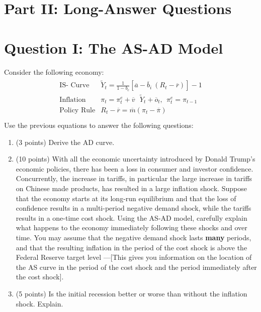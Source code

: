 \documentclass[letterpaper,12pt]{article}
\theoremstyle{dotlessS}
\begin{document}
\section{Part II: Long-Answer Questions}



\section*{Question I: The AS-AD Model}
Consider the following economy:
\begin{eqnarray*}
\begin{array}{ll}
\text{IS- Curve} & \widetilde{Y}_t=\frac{1}{1-b_c}\left[\overline{a}-\overline{b}_i \: (R_t-\overline{r})\right]-1 \\[1.4ex]
\text{Inflation} & \pi_t=\pi^e_t+\overline{v} \: \: \: \widetilde{Y}_t+\overline{o}_t, \: \: \pi^e_t=\pi_{t-1}  \\[1.4ex]
\text{Policy Rule} & R_t-\overline{r}=\overline{m}(\pi_t-\overline{\pi})  \\[1.4ex]
\end{array}
\end{eqnarray*}
Use the previous equations to answer the following questions:
\begin{enumerate}[label=(\alph*)]
\item (3 points) Derive the AD curve.
\item (10 points) With all the economic uncertainty introduced by Donald Trump's economic policies, there has been a loss in consumer and investor confidence. Concurrently, the increase in tariffs, in particular the large increase in tariffs on Chinese made products, has resulted in a large inflation shock. Suppose that the economy starts at its long-run equilibrium and that the loss of confidence results in a multi-period negative demand shock, while the tariffs results in a one-time cost shock. Using the AS-AD model, carefully explain what happens to the economy immediately following these shocks and over time. You may assume that the negative demand shock lasts \textbf{many} periods, and that the resulting inflation in the period of the cost shock is above the Federal Reserve target level ---[This gives you information on the location of the AS curve in the period of the cost shock and the period immediately after the cost shock].
\item (5 points) Is the initial recession better or worse than without the inflation shock. Explain.
\end{enumerate}
\end{document}
